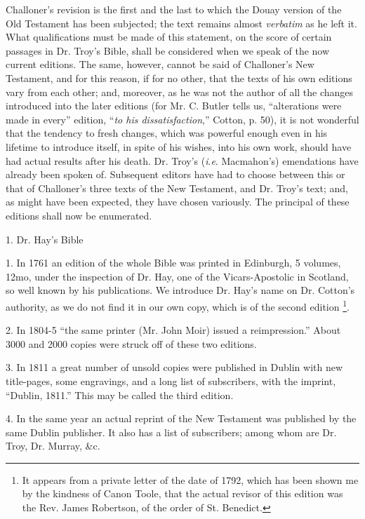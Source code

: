 
Challoner's revision is the first and the last to which the Douay
version of the Old Testament has been subjected; the text remains
almost \emph{verbatim} as he left it. What qualifications must be made
of this statement, on the score of certain passages in Dr. Troy's
Bible, shall be considered when we speak of the now current editions.
The same, however, cannot be said of Challoner's New Testament, and
for this reason, if for no other, that the texts of his own editions
vary from each other; and, moreover, as he was not the author of all
the changes introduced into the later editions (for Mr. C. Butler
tells us, ``alterations were made in every'' edition, ``\emph{to
his dissatisfaction},'' Cotton, p. 50), it is not wonderful
that the tendency to fresh changes, which was powerful enough even in
his lifetime to introduce itself, in spite of his wishes, into his own
work, should have had actual results after his death. Dr. Troy's (\emph{i}.\emph{e}.
Macmahon's) emendations have already been spoken of. Subsequent
editors have had to choose between this or that of Challoner's three
texts of the New Testament, and Dr. Troy's text; and, as might have
been expected, they have chosen variously. The principal of
these editions shall now be enumerated.

1. Dr. Hay's Bible

1. In 1761 an edition of the whole Bible was printed in Edinburgh,
5 volumes, 12mo, under the inspection of Dr. Hay, one of the
Vicars-Apostolic in Scotland, so well known by his publications. We
introduce Dr. Hay's name on Dr. Cotton's authority, as we do not find
it in our own copy, which is of the second edition \footnote{It appears from a private letter of the date of 1792, which has
been shown me by the kindness of Canon Toole, that the actual revisor
of this edition was the Rev. James Robertson, of the order of St.
Benedict.}.

2. In 1804-5 ``the same printer (Mr. John Moir) issued a
reimpression.'' About 3000 and 2000 copies were struck off of
these two editions.

3. In 1811 a great number of unsold copies were published in Dublin
with new title-pages, some engravings, and a long list of subscribers,
with the imprint, ``Dublin, 1811.'' This may be called the
third edition.

4. In the same year an actual reprint of the New Testament was
published by the same Dublin publisher. It also has a list of
subscribers; among whom are Dr. Troy, Dr. Murray, \&c.

